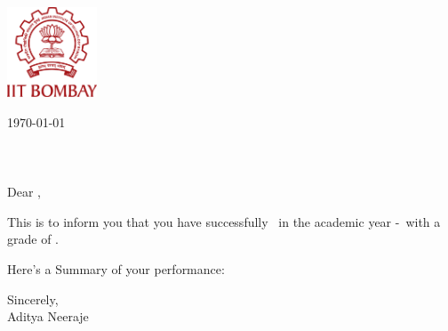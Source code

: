 \documentclass{article}
\begin{document}
\includegraphics[width=0.2\textwidth]{./Logo.png} %

\vspace{0.6in} 

\today \\ \\
\ToNameDef \\
\RollNum \\

Dear \ToNameDef,

This is to inform you that you have successfully \PassStatus\ in the academic year \the\numexpr{}\relax-\the\year\ with a grade of \Grade.

Here's a Summary of your performance:

\TableContent

Sincerely, \\
Aditya Neeraje \\
\end{document}
